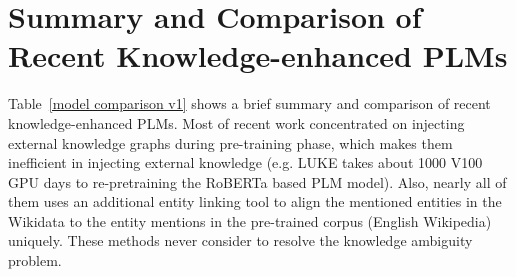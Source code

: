 \documentclass{article} \usepackage{iclr2022_conference,times}
\begin{document}
\appendix
\section{Summary and Comparison of Recent Knowledge-enhanced PLMs}
\label{sec_pre:appendix}

Table~\ref{model comparison v1} shows a brief summary and comparison of recent knowledge-enhanced PLMs. Most of recent work concentrated on injecting external knowledge graphs during pre-training phase, which makes them inefficient in injecting external knowledge (e.g. LUKE takes about 1000 V100 GPU days to re-pretraining the RoBERTa based PLM model). Also, nearly all of them uses an additional entity linking tool to align the mentioned entities in the Wikidata to the entity mentions in the pre-trained corpus (English Wikipedia) uniquely. These methods never consider to resolve the knowledge ambiguity problem.
\end{document}
